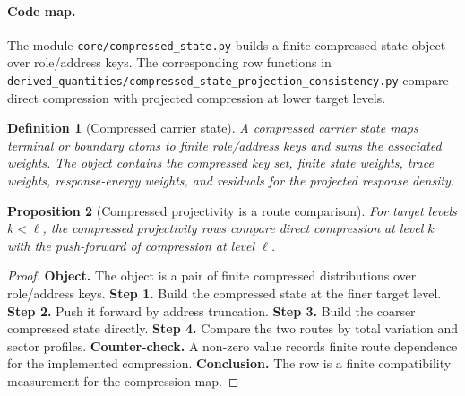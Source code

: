 \documentclass[11pt]{article}
\newtheorem{definition}{Definition}[section]
\newtheorem{proposition}[definition]{Proposition}
\theoremstyle{remark}
\newcommand{\code}[1]{\texttt{#1}}
\numberwithin{equation}{section}
\begin{document}
\paragraph{Code map.} The module \code{core/compressed\_\allowbreak{}state.py} builds a finite compressed state object over role/address keys. The corresponding row functions in \code{derived\_\allowbreak{}quantities/compressed\_\allowbreak{}state\_\allowbreak{}projection\_\allowbreak{}consistency.py} compare direct compression with projected compression at lower target levels.

\begin{definition}[Compressed carrier state]
A compressed carrier state maps terminal or boundary atoms to finite role/address keys and sums the associated weights. The object contains the compressed key set, finite state weights, trace weights, response-energy weights, and residuals for the projected response density.
\end{definition}

\begin{proposition}[Compressed projectivity is a route comparison]
For target levels \(k<\ell\), the compressed projectivity rows compare direct compression at level \(k\) with the push-forward of compression at level \(\ell\).
\end{proposition}
\begin{proof}
\textbf{Object.} The object is a pair of finite compressed distributions over role/address keys. \textbf{Step 1.} Build the compressed state at the finer target level. \textbf{Step 2.} Push it forward by address truncation. \textbf{Step 3.} Build the coarser compressed state directly. \textbf{Step 4.} Compare the two routes by total variation and sector profiles. \textbf{Counter-check.} A non-zero value records finite route dependence for the implemented compression. \textbf{Conclusion.} The row is a finite compatibility measurement for the compression map.
\end{proof}
\end{document}
